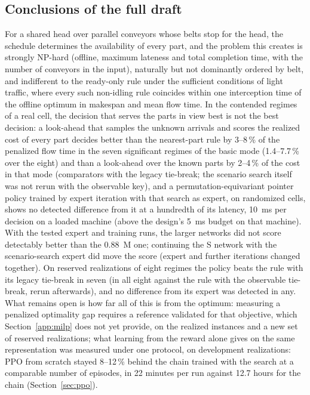 \documentclass[11pt,a4paper]{article}
\theoremstyle{plain}
\theoremstyle{definition}
\theoremstyle{remark}
\begin{document}
\subsection{Conclusions of the full draft}
For a shared head over parallel conveyors whose belts stop for the head, the schedule
determines the availability of every part, and the problem this creates is strongly
NP-hard (offline, maximum lateness and total completion time, with the number of conveyors
in the input), naturally but not dominantly ordered by belt, and indifferent to the ready-only
rule under the sufficient conditions of light traffic, where every such non-idling rule
coincides within one interception time of the offline optimum in makespan and mean flow
time. In the contended regimes of a real cell, the decision that
serves the parts in view best is not the best decision: a look-ahead that samples the
unknown arrivals and scores the realized cost of every part decides better than the
nearest-part rule by 3--8\,\% of the penalized flow time in the seven significant regimes
of the basic mode (1.4--7.7\,\% over the eight) and than a look-ahead over the
known parts by 2--4\,\% of the cost in that mode (comparators with the legacy tie-break;
the scenario search itself was not rerun with the observable key), and a permutation-equivariant pointer policy trained by expert
iteration with that search as expert, on randomized cells, shows no detected difference
from it at a hundredth of its latency, 10~ms per decision on a loaded machine (above
the design's 5~ms budget on that machine). With the
tested expert and training runs, the larger networks did not score detectably better than the
0.88~M one; continuing the S network with the scenario-search expert did move the score
(expert and further iterations changed together). On reserved
realizations of eight regimes the policy beats the rule with its legacy tie-break in seven
(in all eight against the rule with the observable tie-break, rerun afterwards), and no difference
from its expert was detected in any. What remains open is how far all of this is
from the optimum: measuring a penalized optimality gap requires a reference validated
for that objective, which Section~\ref{app:milp} does not yet provide, on the realized
instances and a new set of reserved realizations; what learning from the reward
alone gives on the same representation was measured under one protocol, on development
realizations: PPO from scratch stayed 8--12\,\% behind the chain trained with the search
at a comparable number of episodes, in 22 minutes per run against 12.7 hours for the
chain (Section~\ref{sec:ppo}).



\end{document}

